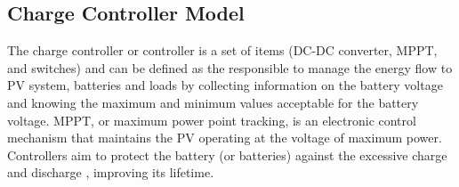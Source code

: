 \documentclass[review]{elsarticle}
\begin{document}
\subsection{Charge Controller Model}
The charge controller or controller is a set of items (DC-DC converter, MPPT, and switches) and can be defined as the responsible to manage the energy flow to PV system, batteries and loads by collecting information on the battery voltage and knowing the maximum and minimum values acceptable for the battery voltage. MPPT, or maximum power point tracking, is an electronic control mechanism that maintains the PV operating at the voltage of maximum power. Controllers aim to protect the battery (or batteries) against the excessive charge and discharge \cite{Pinho}, improving its lifetime. 
%
%
%
%
%
\end{document}

